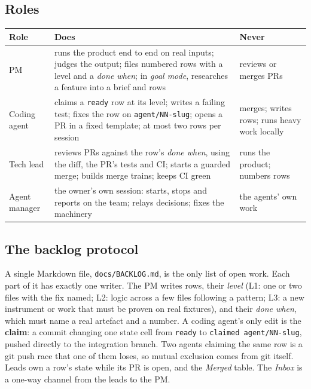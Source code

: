 \documentclass[11pt]{article}
\begin{document}
\subsection{Roles}
\begin{center}
\small
\begin{tabularx}{\linewidth}{@{}lXX@{}}
\toprule
Role & Does & Never \\
\midrule
PM & runs the product end to end on real inputs; judges the output; files numbered rows with a level and a \emph{done when}; in \emph{goal mode}, researches a feature into a brief and rows & reviews or merges PRs \\
Coding agent & claims a \texttt{ready} row at its level; writes a failing test; fixes the row on \texttt{agent/NN-slug}; opens a PR in a fixed template; at most two rows per session & merges; writes rows; runs heavy work locally \\
Tech lead & reviews PRs against the row's \emph{done when}, using the diff, the PR's tests and CI; starts a guarded merge; builds merge trains; keeps CI green & runs the product; numbers rows \\
Agent manager & the owner's own session: starts, stops and reports on the team; relays decisions; fixes the machinery & the agents' own work \\
\bottomrule
\end{tabularx}
\end{center}

\subsection{The backlog protocol}
A single Markdown file, \texttt{docs/BACKLOG.md}, is the only list of open
work. Each part of it has exactly one writer. The PM writes rows, their
\emph{level} (L1: one or two files with the fix named; L2: logic across a few
files following a pattern; L3: a new instrument or work that must be proven on
real fixtures), and their \emph{done when}, which must name a real artefact
and a number. A coding agent's only edit is the \textbf{claim}: a commit
changing one state cell from \texttt{ready} to \texttt{claimed agent/NN-slug},
pushed directly to the integration branch. Two agents claiming the same row is
a git push race that one of them loses, so mutual exclusion comes from git
itself. Leads own a row's state while its PR is open, and the \emph{Merged}
table. The \emph{Inbox} is a one-way channel from the leads to the PM.
\end{document}
